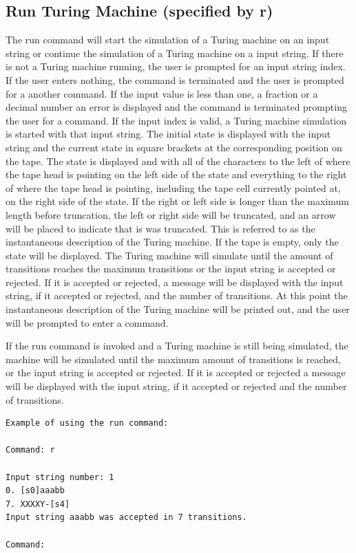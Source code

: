 \documentclass{report}
\begin{document}
\subsection{Run Turing Machine (specified by r)} 

The run command will start the simulation of a Turing machine on an input string or continue the simulation of a Turing machine on a input string. If there is not a Turing machine running, the user is prompted for an input string index. If the user enters nothing, the command is terminated and the user is prompted for a another command. If the input value is less than one, a fraction or a decimal number an error is displayed and the command is terminated prompting the user for a command. If the input index is valid, a Turing machine simulation is started with that input string. The initial state is displayed with the input string and the current state in square brackets at the corresponding position on the tape. The state is displayed and with all of the characters to the left of where the tape head is pointing on the left side of the state and everything to the right of where the tape head is pointing, including the tape cell currently pointed at, on the right side of the state. If the right or left side is longer than the maximum length before truncation, the left or right side will be truncated, and an arrow will be placed to indicate that is was truncated. This is referred to as the instantaneous description of the Turing machine. If the tape is empty, only the state will be displayed. The Turing machine will simulate until the amount of transitions reaches the maximum transitions or the input string is accepted or rejected. If it is accepted or rejected, a message will be displayed with the input string, if it accepted or rejected, and the number of transitions. At this point the instantaneous description of the Turing machine will be printed out, and the user will be prompted to enter a command. 

\par If the run command is invoked and a Turing machine is still being simulated, the machine will be simulated until the maximum amount of transitions is reached, or the input string is accepted or rejected. If it is accepted or rejected a message will be displayed with the input string, if it accepted or rejected and the number of transitions.




\begin{verbatim}
Example of using the run command:

Command: r

Input string number: 1
0. [s0]aaabb
7. XXXXY-[s4]
Input string aaabb was accepted in 7 transitions.

Command: 
\end{verbatim}
\end{document}
